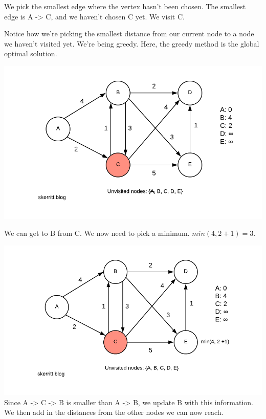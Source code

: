\documentclass{article}
\begin{document}
We pick the smallest edge where the vertex hasn't been chosen. The smallest edge is A -> C, and we haven't chosen C yet. We visit C.

Notice how we're picking the smallest distance from our current node to a node we haven't visited yet. We're being greedy. Here, the greedy method is the global optimal solution.

\includegraphics{Blank-Diagram-36-.png}

We can get to B from C. We now need to pick a minimum. $min(4, 2 + 1) = 3$.

\includegraphics{images/Blank-Diagram-37-.png}
Since A -> C -> B is smaller than A -> B, we update B with this information. We then add in the distances from the other nodes we can now reach.
\end{document}
